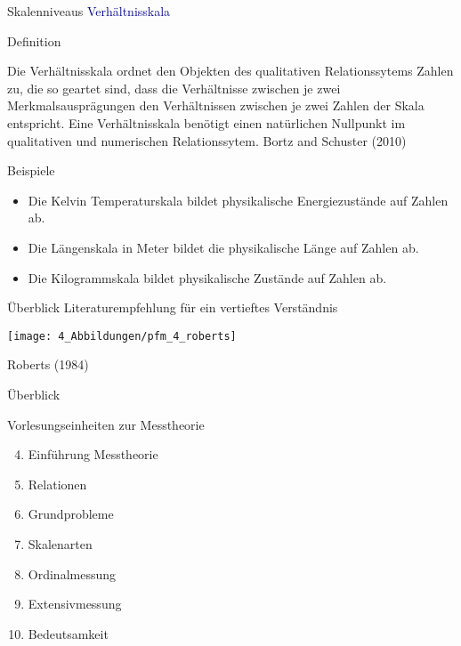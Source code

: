 \documentclass[
  8pt,
  ignorenonframetext,
]{beamer}
\providecommand{\tightlist}{%
  \setlength{\itemsep}{0pt}\setlength{\parskip}{0pt}}
\begin{document}
\begin{frame}{Skalenniveaus}
\protect\hypertarget{skalenniveaus}{}
\textcolor{darkblue}{Verhältnisskala}

Definition

\small

Die Verhältnisskala ordnet den Objekten des qualitativen Relationssytems
Zahlen zu, die so geartet sind, dass die Verhältnisse zwischen je zwei
Merkmalsausprägungen den Verhältnissen zwischen je zwei Zahlen der Skala
entspricht. Eine Verhältnisskala benötigt einen natürlichen Nullpunkt im
qualitativen und numerischen Relationssytem. \footnotesize \flushright
Bortz and Schuster (2010)

\justifying
\normalsize

Beispiele

\begin{itemize}
\tightlist
\item
  \small Die Kelvin Temperaturskala bildet physikalische Energiezustände
  auf Zahlen ab.
\item
  Die Längenskala in Meter bildet die physikalische Länge auf Zahlen ab.
\item
  Die Kilogrammskala bildet physikalische Zustände auf Zahlen ab.
\end{itemize}
\end{frame}

\begin{frame}{Überblick}
\protect\hypertarget{uxfcberblick-12}{}
Literaturempfehlung für ein vertieftes Verständnis \vfill

\begin{center}\texttt{[image: 4\_Abbildungen/pfm\_4\_roberts]} \end{center}
\footnotesize
\flushright

Roberts (1984)
\end{frame}

\begin{frame}{Überblick}
\protect\hypertarget{uxfcberblick-13}{}

Vorlesungseinheiten zur Messtheorie

\begin{enumerate}
[(1)]
\setcounter{enumi}{3}
\tightlist
\item
  Einführung Messtheorie
\item
  Relationen
\item
  Grundprobleme
\item
  Skalenarten
\item
  Ordinalmessung
\item
  Extensivmessung
\item
  Bedeutsamkeit
\end{enumerate}
\end{frame}
\end{document}
